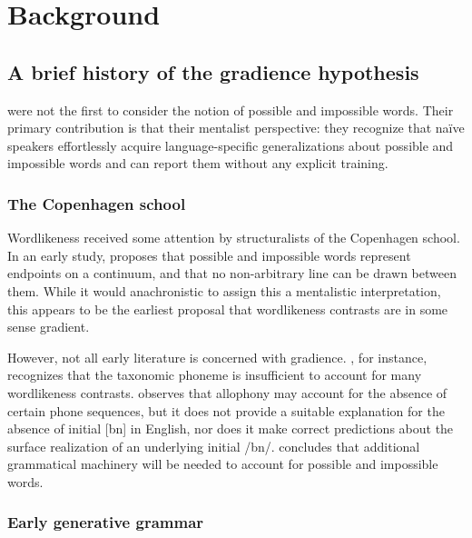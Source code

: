 \section{Background}
\label{2background}

\subsection{A brief history of the gradience hypothesis} 
\label{history}

\citeauthor{Chomsky1965} were not the first to consider the notion of possible and impossible words. Their primary contribution is that their mentalist perspective: they recognize that naïve speakers effortlessly acquire language-specific generalizations about possible and impossible words and can report them without any explicit training.

\subsubsection{The Copenhagen school}

Wordlikeness received some attention by structuralists of the Copenhagen school. In an early study, \citet{Fischer-Jorgensen1952} proposes that possible and impossible words represent endpoints on a continuum, and that no non-arbitrary line can be drawn between them. While it would anachronistic to assign this a mentalistic interpretation, this appears to be the earliest proposal that wordlikeness contrasts are in some sense gradient. 

However, not all early literature is concerned with gradience. \citet[31]{Vogt1954}, for instance, recognizes that the taxonomic phoneme is insufficient to account for many wordlikeness contrasts. \citeauthor{Vogt1954} observes that allophony may account for the absence of certain phone sequences, but it does not provide a suitable explanation for the absence of initial [bn] in English, nor does it make correct predictions about the surface realization of an underlying initial /bn/. \citeauthor{Vogt1954} concludes that additional grammatical machinery will be needed to account for possible and impossible words. 

\subsubsection{Early generative grammar}

